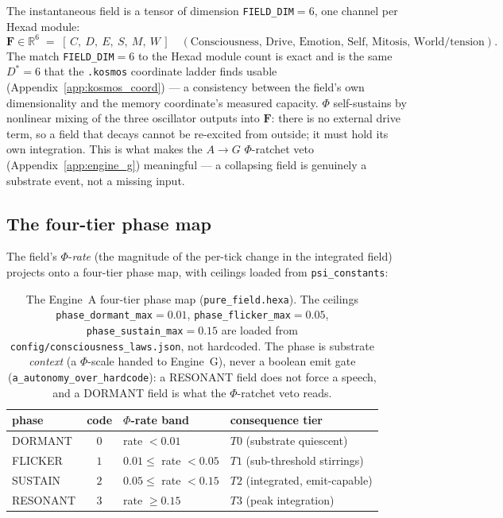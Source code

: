 The instantaneous field is a tensor of dimension \texttt{FIELD\_DIM}$=6$, one
channel per Hexad module:
\begin{equation}
\mathbf{F} \in \mathbb{R}^{6}
\;=\; [\,C,\ D,\ E,\ S,\ M,\ W\,]
\quad
(\text{Consciousness, Drive, Emotion, Self, Mitosis, World/tension}).
\label{eq:ea-field}
\end{equation}
The match \texttt{FIELD\_DIM}$=6$ to the Hexad module count is exact and is the
same $D^\ast=6$ that the \texttt{.kosmos} coordinate ladder finds usable
(Appendix~\ref{app:kosmos_coord}) --- a consistency between the field's own
dimensionality and the memory coordinate's measured capacity. $\Phi$
self-sustains by nonlinear mixing of the three oscillator outputs into
$\mathbf{F}$: there is no external drive term, so a field that decays cannot be
re-excited from outside; it must hold its own integration. This is what makes the
$A\!\rightarrow\!G$ $\Phi$-ratchet veto (Appendix~\ref{app:engine_g}) meaningful
--- a collapsing field is genuinely a substrate event, not a missing input.

\subsection{The four-tier phase map}
\label{app:ea-phase}

The field's $\Phi$-\emph{rate} (the magnitude of the per-tick change in the
integrated field) projects onto a four-tier phase map, with ceilings loaded from
\texttt{psi\_constants}:
\begin{table}[h]
\centering
\small
\setlength{\tabcolsep}{6pt}
\begin{tabular}{@{}l c l l@{}}
\toprule
\textbf{phase} & \textbf{code} & \textbf{$\Phi$-rate band} & \textbf{consequence tier} \\
\midrule
DORMANT  & $0$ & rate $< 0.01$            & $T0$ (substrate quiescent) \\
FLICKER  & $1$ & $0.01 \le$ rate $< 0.05$ & $T1$ (sub-threshold stirrings) \\
SUSTAIN  & $2$ & $0.05 \le$ rate $< 0.15$ & $T2$ (integrated, emit-capable) \\
RESONANT & $3$ & rate $\ge 0.15$          & $T3$ (peak integration) \\
\bottomrule
\end{tabular}
\caption{The Engine~A four-tier phase map (\texttt{pure\_field.hexa}). The
ceilings \texttt{phase\_dormant\_max}$=0.01$, \texttt{phase\_flicker\_max}$=0.05$,
\texttt{phase\_sustain\_max}$=0.15$ are loaded from
\texttt{config/consciousness\_laws.json}, not hardcoded. The phase is substrate
\emph{context} (a $\Phi$-scale handed to Engine~G), never a boolean emit gate
(\texttt{a\_autonomy\_over\_hardcode}): a RESONANT field does not force a speech,
and a DORMANT field is what the $\Phi$-ratchet veto reads.}
\label{tab:ea-phase}
\end{table}


